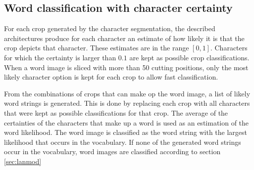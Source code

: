 \subsection{Word classification with character certainty}
For each crop generated by the character segmentation, the described architectures produce for each character an estimate of how likely it is that the crop depicts that character. These estimates are in the range $[0, 1]$. Characters for which the certainty is larger than $0.1$ are kept as possible crop classifications. When a word image is sliced with more than 50 cutting positions, only the most likely character option is kept for each crop to allow fast classification.

From the combinations of crops that can make op the word image, a list of likely word strings is generated. This is done by replacing each crop with all characters that were kept as possible classifications for that crop. The average of the certainties of the characters that make up a word is used as an estimation of the word likelihood. The word image is classified as the word string with the largest likelihood that occurs in the vocabulary. If none of the generated word strings occur in the vocabulary, word images are classified according to section \ref{sec:lanmod}
